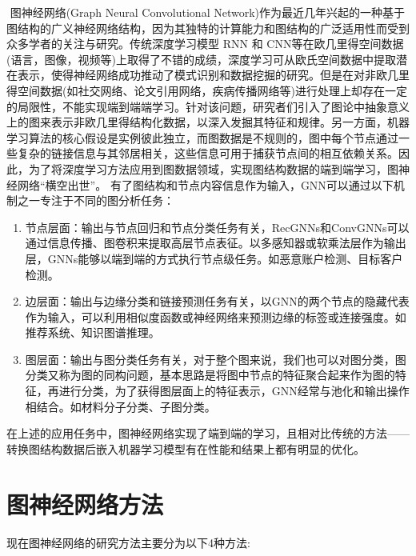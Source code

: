 \documentclass[10pt,journal,compsoc]{IEEEtran}
\begin{document}
​	图神经网络(Graph Neural Convolutional Network)作为最近几年兴起的一种基于图结构的广义神经网络结构，因为其独特的计算能力和图结构的广泛适用性而受到众多学者的关注与研究。传统深度学习模型 RNN 和 CNN等在欧几里得空间数据(语言，图像，视频等)上取得了不错的成绩，深度学习可从欧氏空间数据中提取潜在表示，使得神经网络成功推动了模式识别和数据挖掘的研究。但是在对非欧几里得空间数据(如社交网络、论文引用网络，疾病传播网络等)进行处理上却存在一定的局限性，不能实现端到端端学习。针对该问题，研究者们引入了图论中抽象意义上的图来表示非欧几里得结构化数据，以深入发掘其特征和规律。另一方面，机器学习算法的核心假设是实例彼此独立，而图数据是不规则的，图中每个节点通过一些复杂的链接信息与其邻居相关，这些信息可用于捕获节点间的相互依赖关系。因此，为了将深度学习方法应用到图数据领域，实现图结构数据的端到端学习，图神经网络“横空出世”。
有了图结构和节点内容信息作为输入，GNN可以通过以下机制之一专注于不同的图分析任务：
\begin{enumerate}
\item 节点层面：输出与节点回归和节点分类任务有关，RecGNNs和ConvGNNs可以通过信息传播、图卷积来提取高层节点表征。以多感知器或软乘法层作为输出层，GNNs能够以端到端的方式执行节点级任务。如恶意账户检测、目标客户检测。

\item 边层面：输出与边缘分类和链接预测任务有关，以GNN的两个节点的隐藏代表作为输入，可以利用相似度函数或神经网络来预测边缘的标签或连接强度。如推荐系统、知识图谱推理。

\item 图层面：输出与图分类任务有关，对于整个图来说，我们也可以对图分类，图分类又称为图的同构问题，基本思路是将图中节点的特征聚合起来作为图的特征，再进行分类，为了获得图层面上的特征表示，GNN经常与池化和输出操作相结合。如材料分子分类、子图分类。
\end{enumerate}

在上述的应用任务中，图神经网络实现了端到端的学习，且相对比传统的方法——转换图结构数据后嵌入机器学习模型有在性能和结果上都有明显的优化。

\section{图神经网络方法}

现在图神经网络的研究方法主要分为以下4种方法:
\end{document}
